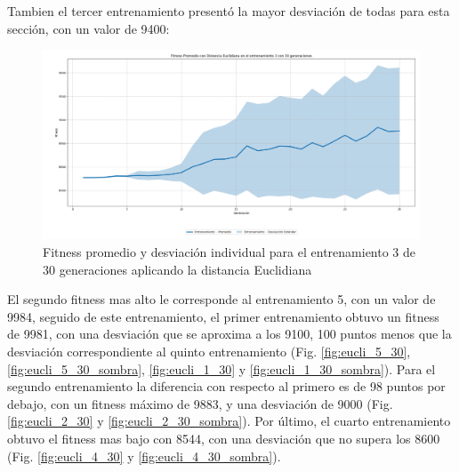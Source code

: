 \documentclass[conference]{IEEEtran}
\begin{document}
Tambien el tercer entrenamiento presentó la mayor desviación de todas para esta sección, con un valor de 9400:
\begin{figure}[H]
    \centering
    \includegraphics[width=0.9\linewidth]{Euclidiana/Fitness_individual_30/Fitness_3_Eucli_30Gen_Sombra.png}
    \caption{Fitness promedio y desviación individual para el entrenamiento 3 de 30 generaciones aplicando la distancia Euclidiana}
    \label{fig:Fitnes_ecu_3_30_inv_sombra}
\end{figure}
El segundo fitness mas alto le corresponde al entrenamiento 5, con un valor de 9984, seguido de este entrenamiento, el primer entrenamiento obtuvo un fitness de 9981, con una desviación que se aproxima a los 9100, 100 puntos menos que la desviación correspondiente al quinto entrenamiento (Fig. \ref{fig:eucli_5_30}, \ref{fig:eucli_5_30_sombra}, \ref{fig:eucli_1_30} y  \ref{fig:eucli_1_30_sombra}). Para el segundo entrenamiento la diferencia con respecto al primero es de 98 puntos por debajo, con un fitness máximo de 9883, y una desviación de 9000 (Fig. \ref{fig:eucli_2_30} y \ref{fig:eucli_2_30_sombra}). Por último, el cuarto entrenamiento obtuvo el fitness mas bajo con 8544, con una desviación que no supera los 8600 (Fig. \ref{fig:eucli_4_30} y \ref{fig:eucli_4_30_sombra}).
\end{document}
